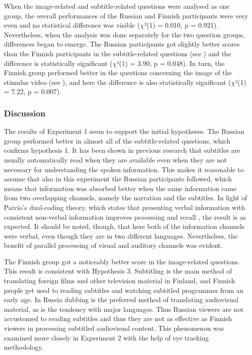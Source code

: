 \documentclass[output=paper]{langsci/langscibook}
\begin{document}
When the image-related and subtitle-related questions were analysed as one group, the overall performances of the Russian and Finnish participants were very even and no statistical difference was visible ($\chi $²(1) = 0.010, p = 0.921). Nevertheless, when the analysis was done separately for the two question groups, differences began to emerge. The Russian participants got slightly better scores than the Finnish participants in the subtitle-related questions (see ) and the difference is statistically significant ($\chi $²(1) = 3.90, p = 0.048).  In turn, the Finnish group performed better in the questions concerning the image of the stimulus video (see ), and here the difference is also statistically significant ($\chi $²(1) = 7.22, p = 0.007).

\subsubsection{Discussion}

The results of Experiment 1 seem to support the initial hypotheses. The Russian group performed better in almost all of the subtitle-related questions, which confirms hypothesis 1. It has been shown in previous research \citep{dydewalle1987} that subtitles are usually automatically read when they are available even when they are not necessary for understanding the spoken information. This makes it reasonable to assume that also in this experiment the Russian participants followed, which means that information was absorbed better when the same information came from two overlapping channels, namely the narration and the subtitles. In light of Paivio’s dual-coding theory, which states that presenting verbal information with consistent non-verbal information improves processing and recall \citep{Paivio1986}, the result is as expected. It should be noted, though, that here both of the information channels were verbal, even though they are in two different languages. Nevertheless, the benefit of parallel processing of visual and auditory channels was evident. 

The Finnish group got a noticeably better score in the image-related questions. This result is consistent with Hypothesis 3. Subtitling is the main method of translating foreign films and other television material in Finland, and Finnish people get used to reading subtitles and watching subtitled programmes from an early age. In Russia dubbing is the preferred method of translating audiovisual material, as is the tendency with major languages. Thus Russian viewers are not accustomed to reading subtitles and thus they are not as effective as Finnish viewers in processing subtitled audiovisual content. This phenomenon was examined more closely in Experiment 2 with the help of eye tracking methodology.
\end{document}
